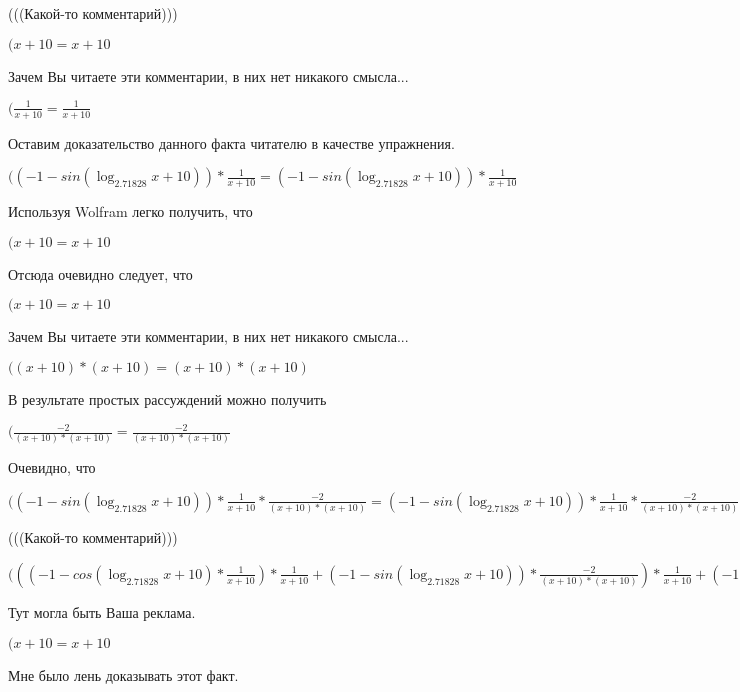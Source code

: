 \documentclass[12pt,a4paper,fleqn]{article}
\theoremstyle{definition}
\begin{document}
(((Какой-то комментарий)))

$( x  +  10  =  x  +  10 $

Зачем Вы читаете эти комментарии, в них нет никакого смысла...

$(\frac{ 1 }{ x  +  10 }
 = \frac{ 1 }{ x  +  10 }
$

Оставим доказательство данного факта читателю в качестве упражнения.

$(( -1  - sin(\log_{ 2.71828 }{ x  +  10 })) * \frac{ 1 }{ x  +  10 }
 = ( -1  - sin(\log_{ 2.71828 }{ x  +  10 })) * \frac{ 1 }{ x  +  10 }
$

Используя Wolfram легко получить, что

$( x  +  10  =  x  +  10 $

Отсюда очевидно следует, что

$( x  +  10  =  x  +  10 $

Зачем Вы читаете эти комментарии, в них нет никакого смысла...

$(( x  +  10 ) * ( x  +  10 ) = ( x  +  10 ) * ( x  +  10 )$

В результате простых рассуждений можно получить

$(\frac{ -2 }{( x  +  10 ) * ( x  +  10 )}
 = \frac{ -2 }{( x  +  10 ) * ( x  +  10 )}
$

Очевидно, что

$(( -1  - sin(\log_{ 2.71828 }{ x  +  10 })) * \frac{ 1 }{ x  +  10 }
 * \frac{ -2 }{( x  +  10 ) * ( x  +  10 )}
 = ( -1  - sin(\log_{ 2.71828 }{ x  +  10 })) * \frac{ 1 }{ x  +  10 }
 * \frac{ -2 }{( x  +  10 ) * ( x  +  10 )}
$

(((Какой-то комментарий)))

$((( -1  - cos(\log_{ 2.71828 }{ x  +  10 }) * \frac{ 1 }{ x  +  10 }
) * \frac{ 1 }{ x  +  10 }
 + ( -1  - sin(\log_{ 2.71828 }{ x  +  10 })) * \frac{ -2 }{( x  +  10 ) * ( x  +  10 )}
) * \frac{ 1 }{ x  +  10 }
 + ( -1  - sin(\log_{ 2.71828 }{ x  +  10 })) * \frac{ 1 }{ x  +  10 }
 * \frac{ -2 }{( x  +  10 ) * ( x  +  10 )}
 = (( -1  - cos(\log_{ 2.71828 }{ x  +  10 }) * \frac{ 1 }{ x  +  10 }
) * \frac{ 1 }{ x  +  10 }
 + ( -1  - sin(\log_{ 2.71828 }{ x  +  10 })) * \frac{ -2 }{( x  +  10 ) * ( x  +  10 )}
) * \frac{ 1 }{ x  +  10 }
 + ( -1  - sin(\log_{ 2.71828 }{ x  +  10 })) * \frac{ 1 }{ x  +  10 }
 * \frac{ -2 }{( x  +  10 ) * ( x  +  10 )}
$

Тут могла быть Ваша реклама.

$( x  +  10  =  x  +  10 $

Мне было лень доказывать этот факт.
\end{document}
